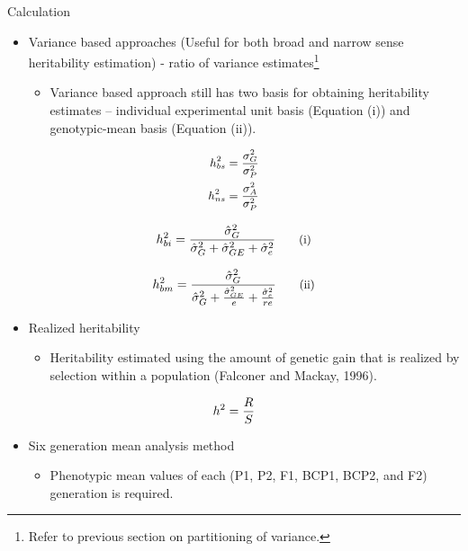 \documentclass[11pt,ignorenonframetext,aspectratio=169]{beamer}
\providecommand{\tightlist}{%
  \setlength{\itemsep}{0pt}\setlength{\parskip}{0pt}}
\begin{document}
\begin{frame}{Calculation}
\protect\hypertarget{calculation}{}
\small

\begin{itemize}
\tightlist
\item
  Variance based approaches (Useful for both broad and narrow sense
  heritability estimation) - ratio of variance
  estimates\footnote[frame]{Refer to previous section on partitioning of variance.}

  \begin{itemize}
  \tightlist
  \item
    Variance based approach still has two basis for obtaining
    heritability estimates -- individual experimental unit basis
    (Equation (i)) and genotypic-mean basis (Equation (ii)).
  \end{itemize}
\end{itemize}

\[
\small
\begin{aligned}
h_{bs}^2 &= \frac{\sigma^2_{G}}{\sigma^2_{P}} \\
h_{ns}^2 &= \frac{\sigma^2_{A}}{\sigma^2_{P}}
\end{aligned}
\]

\[
\small
h^2_{bi} = \frac{\hat{\sigma}^2_G}{\hat{\sigma}^2_G + \hat{\sigma}^2_{GE} + \hat{\sigma}^2_e}
\tag{i}
\]

\[
\small
h^2_{bm} = \frac{\hat{\sigma}^2_G}{\hat{\sigma}^2_G + \frac{\hat{\sigma}^2_{GE}}{e} + \frac{\hat{\sigma}^2_e}{re}}
\tag{ii}
\]
\end{frame}

\begin{frame}{}
\protect\hypertarget{section-11}{}
\begin{itemize}
\tightlist
\item
  Realized heritability

  \begin{itemize}
  \tightlist
  \item
    Heritability estimated using the amount of genetic gain that is
    realized by selection within a population (Falconer and Mackay,
    1996).
  \end{itemize}
\end{itemize}

\[
\small
h^2 = \frac{R}{S}
\]

\begin{itemize}
\tightlist
\item
  Six generation mean analysis method

  \begin{itemize}
  \tightlist
  \item
    Phenotypic mean values of each (P1, P2, F1, BCP1, BCP2, and F2)
    generation is required.
  \end{itemize}
\end{itemize}
\end{frame}
\end{document}
